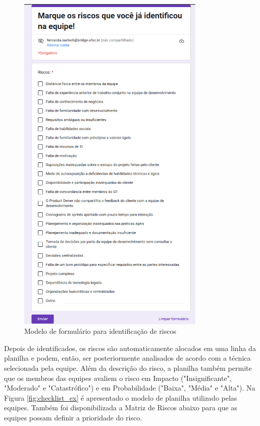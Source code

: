 \documentclass[
    12pt,       %
    openright,      %
    twoside,      %
    a4paper,      %
    english,      %
    french,       %
    spanish,      %
    brazil,       %
    ]{abntex2}
\begin{document}
\begin{figure}
    \centering
    \includegraphics[width=0.8\textwidth]{src/tex/img/modelo-formulario.png}
    \caption{Modelo de formulário para identificação de riscos}
    \label{fig:form_model}
\end{figure}

Depois de identificados, os riscos são automaticamente alocados em uma linha da planilha e podem, então, ser posteriormente analisados de acordo com a técnica selecionada pela equipe. Além da descrição do risco, a planilha também permite que os membros das equipes avaliem o risco em Impacto ("Insignificante", "Moderado" e "Catastrófico") e em Probabilidade ("Baixa", "Média" e "Alta"). Na Figura \ref{fig:checklist_ex} é apresentado o modelo de planilha utilizado pelas equipes. Também foi disponibilizada a Matriz de Riscos abaixo para que as equipes possam definir a prioridade do risco. 
\end{document}
